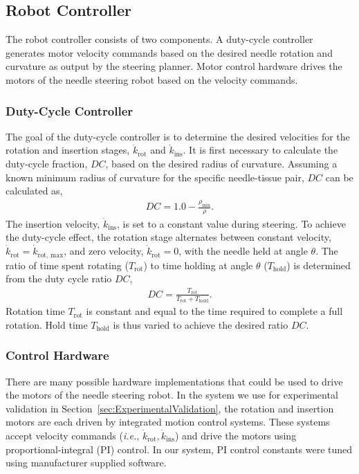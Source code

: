 \subsection{Robot Controller} 
The robot controller consists of two components. A duty-cycle controller generates motor velocity commands based on the desired needle rotation and curvature as output by the steering planner. Motor control hardware drives the motors of the needle steering robot based on the velocity commands.

\subsubsection{Duty-Cycle Controller}
The goal of the duty-cycle controller is to determine the desired velocities for the rotation and insertion stages, $\dot{k}_\text{rot}$ and $\dot{k}_\text{ins}$. It is first necessary to calculate the duty-cycle fraction, $DC$, based on the desired radius of curvature. Assuming a known minimum radius of curvature for the specific needle-tissue pair, $DC$ can be calculated as,
\begin{align}
DC = 1.0 - \frac{\rho_\text{min}}{\rho}. 
\label{eq:DC}
\end{align}
The insertion velocity, $\dot{k}_\text{ins}$, is set to a constant value during steering.  To achieve the duty-cycle effect, the rotation stage alternates between constant velocity, $\dot{k}_\text{rot} = \dot{k}_\text{rot, max}$, and zero velocity, $\dot{k}_\text{rot} = 0$, with the needle held at angle $\theta$. The ratio of time spent rotating ($T_\text{rot}$) to time holding at angle $\theta$ ($T_\text{hold}$) is determined from the duty cycle ratio $DC$,
\begin{align}
DC =\frac{T_\text{rot}}{T_\text{rot}+T_\text{hold}}.
\end{align}
Rotation time $T_\text{rot}$ is constant and equal to the time required to complete a full rotation. Hold time $T_\text{hold}$ is thus varied to achieve the desired ratio $DC$.

\subsubsection{Control Hardware}
There are many possible hardware implementations that could be used to drive the motors of the needle steering robot. In the system we use for experimental validation in Section~\ref{sec:ExperimentalValidation}, the rotation and insertion motors are each driven by integrated motion control systems. These systems accept velocity commands (\textit{i.e.}, $\dot{k}_\text{rot}, \dot{k}_\text{ins}$) and drive the motors using proportional-integral (PI) control. In our system, PI control constants were tuned using manufacturer supplied software.

